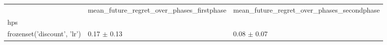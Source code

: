 \begin{tabular}{lll}
\toprule
 & mean_future_regret_over_phases_firstphase & mean_future_regret_over_phases_secondphase \\
hps &  &  \\
\midrule
frozenset({'discount', 'lr'}) & 0.17 $\pm$ 0.13 & 0.08 $\pm$ 0.07 \\
\bottomrule
\end{tabular}
